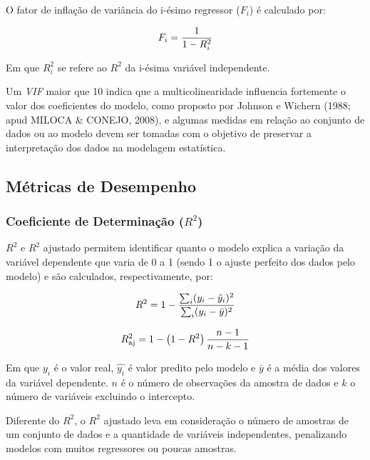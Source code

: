 \documentclass[english, spanish, brazilian]{RBIEarticle} %
\begin{document}
O fator de inflação de variância do i-ésimo regressor ($F_i$)  é calculado por:

\vspace{0.5cm}
\begin{equation}
\large F_i = \frac{1}{1-R_i^2}
\end{equation}
\vspace{0.5cm}


Em que $R_i^2$ se refere ao $R^2$ da i-ésima variável independente.

Um \textit{VIF} maior que 10 indica que a multicolinearidade influencia fortemente o valor dos coeficientes do modelo, como proposto por Johnson e Wichern (1988; apud MILOCA \& CONEJO, 2008), e algumas medidas em relação ao conjunto de dados ou ao modelo devem ser tomadas com o objetivo de preservar a interpretação dos dados na modelagem estatística.

\subsection{Métricas de Desempenho}
\subsubsection{Coeficiente de Determinação ($R^2$)}
$R^2$ e $R^2$ ajustado permitem identificar quanto o modelo explica a variação da variável dependente que varia de 0 a 1 (sendo 1 o ajuste perfeito dos dados pelo modelo) e são calculados, respectivamente, por:

\vspace{0.5cm}
\begin{equation}
\large R^2 = 1 - \frac{\sum_i(y_i-\hat{y}_i)^2}{\sum_i(y_i-\bar{y})^2}
\end{equation}
\vspace{0.5cm}

\vspace{0.5cm}
\begin{equation}
\large R^2_{\text{aj}} = 1 - \left(1 - R^2\right)\frac{n - 1}{n - k - 1}
\end{equation}
\vspace{0.5cm}


Em que $y_i$ é o valor real, $\hat{y_i}$ é valor predito pelo modelo e $\bar{y}$ é a média dos valores da variável dependente. $n$ é o número de observações da amostra de dados e $k$ o número de variáveis excluindo o intercepto.

Diferente do $R^2$, o $R^2$ ajustado leva em consideração o número de amostras de um conjunto de dados e a quantidade de variáveis independentes, penalizando modelos com muitos regressores ou poucas amostras. 
\end{document}
